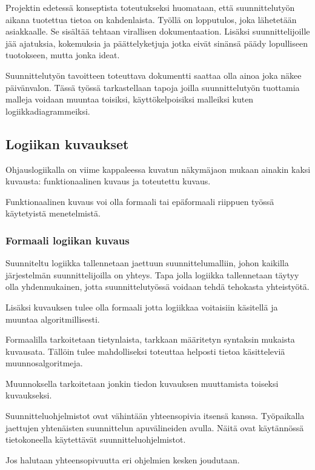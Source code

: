 \documentclass[finnish,12pt]{article}
\begin{document}
Projektin edetessä konseptista toteutukseksi huomataan, että suunnittelutyön aikana tuotettua tietoa on kahdenlaista. Työllä on lopputulos, joka lähetetään asiakkaalle. Se sisältää tehtaan virallisen dokumentaation. Lisäksi suunnittelijoille jää ajatuksia, kokemuksia ja päättelyketjuja jotka eivät sinänsä päädy lopulliseen tuotokseen, mutta jonka ideat. 

Suunnittelutyön tavoitteen toteuttava dokumentti saattaa olla ainoa joka näkee päivänvalon.
Tässä työssä tarkastellaan tapoja joilla suunnittelutyön tuottamia malleja voidaan muuntaa toisiksi, käyttökelpoisiksi malleiksi kuten logiikkadiagrammeiksi.

	\subsection{Logiikan kuvaukset}

	Ohjauslogiikalla on viime kappaleessa kuvatun näkymäjaon mukaan ainakin kaksi kuvausta: funktionaalinen kuvaus ja toteutettu kuvaus.
	
	Funktionaalinen kuvaus voi olla formaali tai epäformaali riippuen työssä käytetyistä menetelmistä.

		\subsubsection{Formaali logiikan kuvaus}
	
Suunniteltu logiikka tallennetaan jaettuun suunnittelumalliin, johon kaikilla järjestelmän suunnittelijoilla on yhteys.
Tapa jolla logiikka tallennetaan täytyy olla yhdenmukainen, jotta suunnittelutyössä voidaan tehdä tehokasta yhteistyötä.

Lisäksi kuvauksen tulee olla formaali jotta logiikkaa voitaisiin käsitellä ja muuntaa algoritmillisesti.

Formaalilla tarkoitetaan tietynlaista, tarkkaan määritetyn syntaksin mukaista kuvausata.
Tällöin tulee mahdolliseksi toteuttaa helposti tietoa käsitteleviä muunnosalgoritmeja.

Muunnoksella tarkoitetaan jonkin tiedon kuvauksen muuttamista toiseksi kuvaukseksi.

Suunnitteluohjelmistot ovat vähintään yhteensopivia itsensä kanssa.
Työpaikalla jaettujen yhtenäisten suunnittelun apuvälineiden avulla.
Näitä ovat käytännössä tietokoneella käytettävät suunnitteluohjelmistot.

Jos halutaan yhteensopivuutta eri ohjelmien kesken joudutaan.
\end{document}

